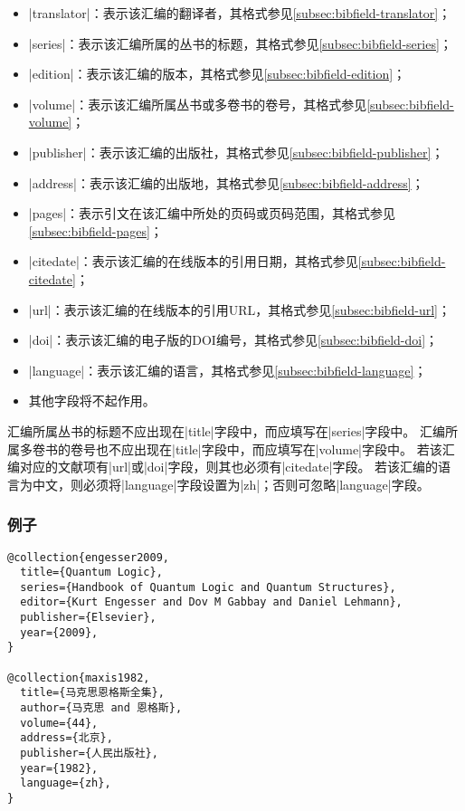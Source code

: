 \begin{itemize}
\item |translator|：表示该汇编的翻译者，其格式参见\ref{subsec:bibfield-translator}；
\item |series|：表示该汇编所属的丛书的标题，其格式参见\ref{subsec:bibfield-series}；
\item |edition|：表示该汇编的版本，其格式参见\ref{subsec:bibfield-edition}；
\item |volume|：表示该汇编所属丛书或多卷书的卷号，其格式参见\ref{subsec:bibfield-volume}；
\item |publisher|：表示该汇编的出版社，其格式参见\ref{subsec:bibfield-publisher}；
\item |address|：表示该汇编的出版地，其格式参见\ref{subsec:bibfield-address}；
\item |pages|：表示引文在该汇编中所处的页码或页码范围，其格式参见\ref{subsec:bibfield-pages}；
\item |citedate|：表示该汇编的在线版本的引用日期，其格式参见\ref{subsec:bibfield-citedate}；
\item |url|：表示该汇编的在线版本的引用URL，其格式参见\ref{subsec:bibfield-url}；
\item |doi|：表示该汇编的电子版的DOI编号，其格式参见\ref{subsec:bibfield-doi}；
\item |language|：表示该汇编的语言，其格式参见\ref{subsec:bibfield-language}；
\item 其他字段将不起作用。
\end{itemize}

\begin{note}
汇编所属丛书的标题不应出现在|title|字段中，而应填写在|series|字段中。
汇编所属多卷书的卷号也不应出现在|title|字段中，而应填写在|volume|字段中。
若该汇编对应的文献项有|url|或|doi|字段，则其也必须有|citedate|字段。
若该汇编的语言为中文，则必须将|language|字段设置为|zh|；否则可忽略|language|字段。
\end{note}

\subsubsection{例子}

\begin{verbatim}
@collection{engesser2009,
  title={Quantum Logic},
  series={Handbook of Quantum Logic and Quantum Structures},
  editor={Kurt Engesser and Dov M Gabbay and Daniel Lehmann},
  publisher={Elsevier},  
  year={2009},  
}

@collection{maxis1982,
  title={马克思恩格斯全集},
  author={马克思 and 恩格斯},  
  volume={44},
  address={北京},
  publisher={人民出版社},
  year={1982},
  language={zh},
}
\end{verbatim}

